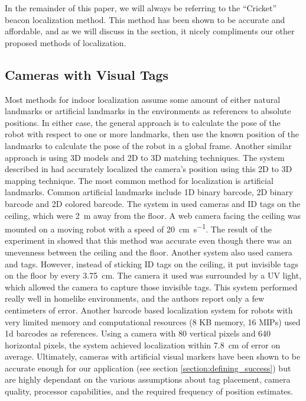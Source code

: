 \documentclass{article}
\begin{document}
    In the remainder of this paper, we will always be referring to the ``Cricket'' beacon localization method. This method has been shown to be accurate and affordable, and as we will discuss in the  section, it nicely compliments our other proposed methods of localization.

  \subsection{Cameras with Visual Tags}

    Most methods for indoor localization assume some amount of either natural landmarks or artificial landmarks in the environments as references to absolute positions. In either case, the general approach is to calculate the pose of the robot with respect to one or more landmarks, then use the known position of the landmarks to calculate the pose of the robot in a global frame. Another similar approach is using 3D models and 2D to 3D matching techniques. The system described in \cite{sattler_fast_2011} had accurately localized the camera's position using this 2D to 3D mapping technique. The most common method for localization is artificial landmarks. Common artificial landmarks include 1D binary barcode, 2D binary barcode and 2D colored barcode. The system in \cite{lin_localization_2004} used cameras and ID tags on the ceiling, which were \SI{2}{\meter} away from the floor. A web camera facing the ceiling was mounted on a moving robot with a speed of \SI{20}{\centi\meter\per\second}. The result of the experiment in \cite{lin_localization_2004} showed that this method was accurate even though there was an unevenness between the ceiling and the floor. Another system \cite{huh_mobile_2007} also used camera and tags. However, instead of sticking ID tags on the ceiling, it put invisible tags on the floor by every \SI{3.75}{\centi\meter}. The camera it used was surrounded by a UV light, which allowed the camera to capture those invisible tags. This system performed really well in homelike environments, and the authors report only a few centimeters of error. Another barcode based localization system for robots with very limited memory and computational resources (8 KB memory, 16 MIPs) \cite{dias_barcode-based_2012} used 1d barcodes as references. Using a camera with 80 vertical pixels and 640 horizontal pixels, the system achieved localization within \SI{7.8}{\centi\meter} of error on average. Ultimately, cameras with artificial visual markers have been shown to be accurate enough for our application (see section \ref{section:defining_success}) but are highly dependant on the various assumptions about tag placement, camera quality, processor capabilities, and the required frequency of position estimates.
\end{document}
